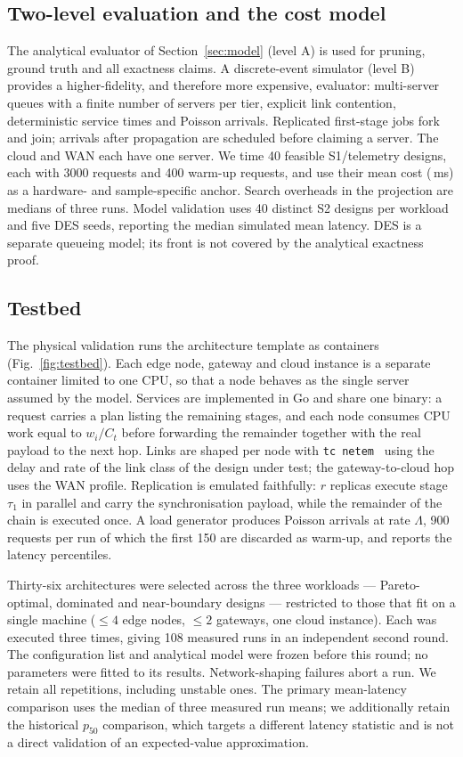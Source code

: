 \subsection{Two-level evaluation and the cost model}
The analytical evaluator of Section~\ref{sec:model} (level A) is used for pruning,
ground truth and all exactness claims. A discrete-event simulator (level B) provides a
higher-fidelity, and therefore more expensive, evaluator: multi-server queues with a
finite number of servers per tier, explicit link contention, deterministic service times
and Poisson arrivals. Replicated first-stage jobs fork and join; arrivals after propagation
are scheduled before claiming a server. The cloud and WAN each have one server. We time
40 feasible S1/telemetry designs, each with 3000 requests and 400 warm-up requests, and
use their mean cost (\DesCostMs\,ms) as a hardware- and sample-specific anchor. Search
overheads in the projection are medians of three runs. Model validation uses 40 distinct
S2 designs per workload and five DES seeds, reporting the median simulated mean latency.
DES is a separate queueing model; its front is not covered by the analytical exactness proof.

\subsection{Testbed}
\label{sec:testbed}
The physical validation runs the architecture template as containers
(Fig.~\ref{fig:testbed}). Each edge node, gateway and cloud instance is a separate
container limited to one CPU, so that a node behaves as the single server assumed by the
model. Services are implemented in Go and share one binary: a request carries a plan
listing the remaining stages, and each node consumes CPU work equal to $w_i/C_t$ before
forwarding the remainder together with the real payload to the next hop. Links are shaped
per node with \texttt{tc netem}~\cite{hemminger2005netem} using the delay and rate of the
link class of the design under test; the gateway-to-cloud hop uses the WAN profile.
Replication is emulated faithfully: $r$ replicas execute stage $\tau_1$ in parallel and
carry the synchronisation payload, while the remainder of the chain is executed once.
A load generator produces Poisson arrivals at rate $\Lambda$, 900 requests per run of
which the first 150 are discarded as warm-up, and reports the latency percentiles.

Thirty-six architectures were selected across the three workloads --- Pareto-optimal,
dominated and near-boundary designs --- restricted to those that fit on a single machine
($\le4$ edge nodes, $\le2$ gateways, one cloud instance). Each was executed three times,
giving 108 measured runs in an independent second round. The configuration list and
analytical model were frozen before this round; no parameters were fitted to its results.
Network-shaping failures abort a run. We retain all repetitions, including unstable ones.
The primary mean-latency comparison uses the median of three measured run means;
we additionally retain the historical $p_{50}$ comparison, which targets a different latency
statistic and is not a direct validation of an expected-value approximation.

